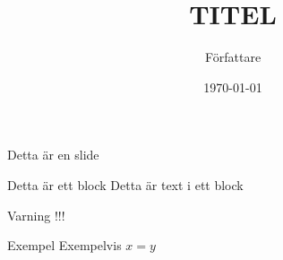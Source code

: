 \documentclass[aspectratio=169,xcolor=dvipsnames]{beamer}
\title{TITEL}
\author[Short Auth]{Författare}
\institute[LTH]{Lunds Universitet, LTH}
\date{\today}
\begin{document}
\begin{frame}
    \titlepage
\end{frame}

\begin{frame}{Detta är en slide}
    \begin{block}{Detta är ett block}
        Detta är text i ett block
    \end{block}
    \begin{alertblock}{Varning}
        !!!
    \end{alertblock}
    \begin{exampleblock}{Exempel}
        Exempelvis $x = y$
    \end{exampleblock}
\end{frame}
\end{document}
